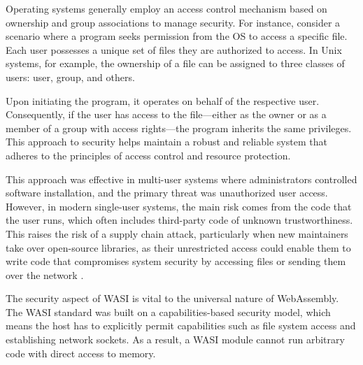 Operating systems generally employ an access control mechanism based on ownership and group associations to manage security. For instance, consider a scenario where a program seeks permission from the OS to access a specific file. Each user possesses a unique set of files they are authorized to access. In Unix systems, for example, the ownership of a file can be assigned to three classes of users: user, group, and others.

Upon initiating the program, it operates on behalf of the respective user. Consequently, if the user has access to the file—either as the owner or as a member of a group with access rights—the program inherits the same privileges. This approach to security helps maintain a robust and reliable system that adheres to the principles of access control and resource protection.

This approach was effective in multi-user systems where administrators controlled software installation, and the primary threat was unauthorized user access. However, in modern single-user systems, the main risk comes from the code that the user runs, which often includes third-party code of unknown trustworthiness. This raises the risk of a supply chain attack, particularly when new maintainers take over open-source libraries, as their unrestricted access could enable them to write code that compromises system security by accessing files or sending them over the network \cite{clark_2019_standardising}.


The security aspect of WASI is vital to the universal nature of WebAssembly. The WASI standard was built on a capabilities-based security model, which means the host has to explicitly permit capabilities such as file system access and establishing network sockets. As a result, a WASI module cannot run arbitrary code with direct access to memory.





